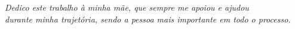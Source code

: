 \begin{dedicatoria}
   \vspace*{\fill}
   \centering
   \noindent

   \textit{Dedico este trabalho à minha mãe, que sempre me apoiou e ajudou\\
    durante minha trajetória, sendo a pessoa mais importante em todo o processo.} \vspace*{\fill}
\end{dedicatoria}
